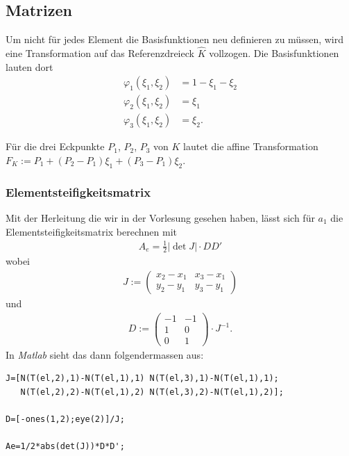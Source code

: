 \documentclass[ngerman,11pt,a4paper,titlepage]{article}
\begin{document}
\subsection{Matrizen}
Um nicht für jedes Element die Basisfunktionen neu definieren zu müssen, wird eine Transformation auf das Referenzdreieck $\hat K$ vollzogen. Die Basisfunktionen lauten dort
\begin{align*}
  \varphi_1(\xi_1,\xi_2) &= 1-\xi_1-\xi_2 \\
  \varphi_2(\xi_1,\xi_2) &= \xi_1 \\
  \varphi_3(\xi_1,\xi_2) &= \xi_2.
\end{align*}

Für die drei Eckpunkte $P_1$, $P_2$, $P_3$ von $K$ lautet die affine Transformation $F_K := P_1+(P_2-P_1)\xi_1 +(P_3-P_1)\xi_2$.

\subsubsection*{Elementsteifigkeitsmatrix}
Mit der Herleitung die wir in der Vorlesung gesehen haben, lässt sich für $a_1$ die Elementsteifigkeitsmatrix berechnen mit
\begin{align*}
  A_e=\frac{1}{2}|\det J |\cdot D D'
\end{align*}
wobei
\begin{align*}
  J:=
  \begin{pmatrix}
    x_2 - x_1 & x_3 - x_1 \\
    y_2 - y_1 & y_3 - y_1
  \end{pmatrix}
\end{align*}
und
\begin{align*}
  D:=
  \begin{pmatrix}
    -1 & -1\\
    1 & 0\\
    0 & 1
  \end{pmatrix}
  \cdot J^{-1}.
\end{align*}
In \emph{Matlab} sieht das dann folgendermassen aus:
\begin{lstlisting}
J=[N(T(el,2),1)-N(T(el,1),1) N(T(el,3),1)-N(T(el,1),1);
   N(T(el,2),2)-N(T(el,1),2) N(T(el,3),2)-N(T(el,1),2)];

D=[-ones(1,2);eye(2)]/J;

Ae=1/2*abs(det(J))*D*D';
\end{lstlisting}
\end{document}
